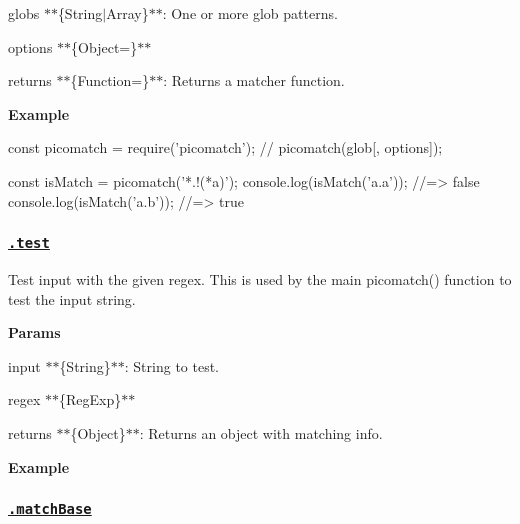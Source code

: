 \begin{DoxyItemize}
\item {\ttfamily globs} $\ast$$\ast$\{String$\vert$\+Array\}$\ast$$\ast$\+: One or more glob patterns.
\item {\ttfamily options} $\ast$$\ast$\{Object=\}$\ast$$\ast$
\item {\ttfamily returns} $\ast$$\ast$\{Function=\}$\ast$$\ast$\+: Returns a matcher function.
\end{DoxyItemize}

{\bfseries Example}


\begin{DoxyCode}
const picomatch = require('picomatch');
// picomatch(glob[, options]);

const isMatch = picomatch('*.!(*a)');
console.log(isMatch('a.a')); //=> false
console.log(isMatch('a.b')); //=> true
\end{DoxyCode}


\subsubsection*{\href{lib/picomatch.js#L109}{\tt .test}}

Test {\ttfamily input} with the given {\ttfamily regex}. This is used by the main {\ttfamily picomatch()} function to test the input string.

{\bfseries Params}


\begin{DoxyItemize}
\item {\ttfamily input} $\ast$$\ast$\{String\}$\ast$$\ast$\+: String to test.
\item {\ttfamily regex} $\ast$$\ast$\{Reg\+Exp\}$\ast$$\ast$
\item {\ttfamily returns} $\ast$$\ast$\{Object\}$\ast$$\ast$\+: Returns an object with matching info.
\end{DoxyItemize}

{\bfseries Example}




\subsubsection*{\href{lib/picomatch.js#L153}{\tt .match\+Base}}

